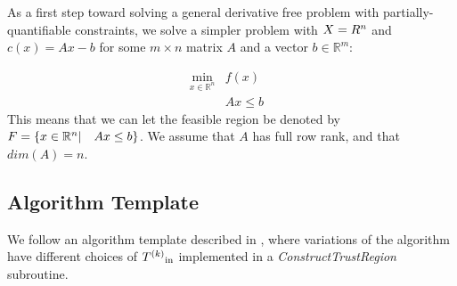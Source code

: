As a first step toward solving a general derivative free problem with partially-quantifiable constraints,
we solve a simpler problem with $X = R^n$ and $c(x) = Ax-b$ for some $m\times n$ matrix $A$ and a vector $b\in \mathbb R^m$:

\[ \begin{array}{ccl} \min_{x \in \mathbb R^n} & f(x) \\
& Ax \le b & 
\end{array}
\]
This means that we can let the feasible region be denoted by ${F} = \{x \in \mathbb R^n | \quad  Ax \le b \}$.
We assume that $A$ has full row rank, and that  $dim(A) = n$.

\subsection{Algorithm Template}

We follow an algorithm template described in \cite{doi:10.1080/10556788.2015.1026968}, where variations of the algorithm have different choices of ${T^{(k)}}_{\text{in}}$ implemented in a \emph{ConstructTrustRegion} subroutine.



